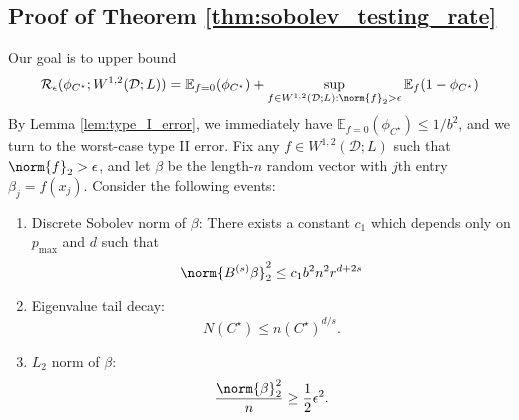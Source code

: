 \documentclass{article}
\newcommand{\1}{\mathbf{1}}
\newcommand{\Ebb}{\mathbb{E}}
\theoremstyle{alden}
\theoremstyle{aldenthm}
\theoremstyle{definition}
\theoremstyle{remark}
\begin{document}
\subsection{Proof of Theorem \ref{thm:sobolev_testing_rate}}
Our goal is to upper bound
\begin{equation*}
\mathcal{R}_{\epsilon}(\phi_{C^{\star}}; W^{1,2}(\mathcal{D};L)) = \Ebb_{f = 0}(\phi_{C^{\star}}) + \sup_{f \in W^{1,2}(\mathcal{D};L): \norm{f}_2 > \epsilon} \Ebb_{f}(1 - \phi_{C^{\star}})
\end{equation*}
By Lemma \ref{lem:type_I_error}, we immediately have $\Ebb_{f = 0}(\phi_{C^{\star}}) \leq 1/b^2$, and we turn to the worst-case type II error. Fix any $f \in W^{1,2}(\mathcal{D};L)$ such that $\norm{f}_2 > \epsilon$, and let $\beta$ be the length-$n$ random vector with $j$th entry $\beta_j = f(x_j)$. Consider the following events:
\begin{enumerate}[label=(E\arabic*)]
	\item 
	\label{event:discrete_sobolev_norm}
	Discrete Sobolev norm of $\beta$: There exists a constant $c_1$ which depends only on $p_{\max}$ and $d$ such that
	\begin{equation*}
	\norm{B^{(s)}\beta}_2^2 \leq c_1 b^2 n^2 r^{d + 2s} 
	\end{equation*}
	\item 
	\label{event:eigenvalue_tail_decay}
	Eigenvalue tail decay:
	\begin{equation*}
	N(C^{\star}) \leq n(C^{\star})^{d/s}.
	\end{equation*}
	\item 
	\label{event:l2_norm}
	$L_2$ norm of $\beta$:
	\begin{equation*}
	\frac{\norm{\beta}_2^2}{n} \geq \frac{1}{2}\epsilon^2.
	\end{equation*}
\end{enumerate} 
\end{document}
